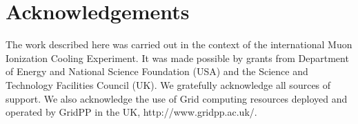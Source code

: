 \section{Acknowledgements}
\label{sec:Acknowledgements}

The work described here was carried out in the context of the international Muon Ionization Cooling Experiment. It was made possible by grants from Department of Energy and National Science Foundation (USA) and the Science and Technology Facilities Council (UK). We gratefully acknowledge all sources of support. We also acknowledge the use of Grid computing resources deployed and operated by GridPP in the UK, http://www.gridpp.ac.uk/.